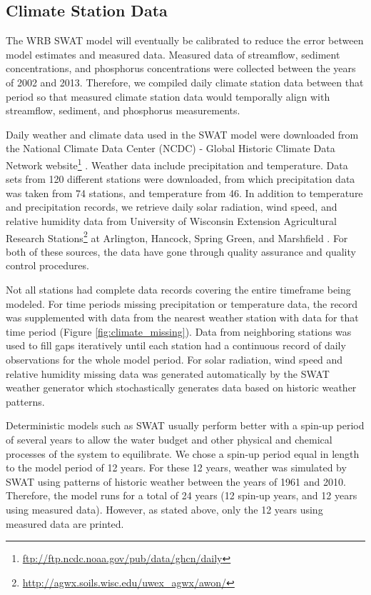 \subsection{Climate Station Data}\label{sec:climate_data}

The WRB SWAT model will eventually be calibrated to reduce the error between model estimates and measured data. Measured data of streamflow, sediment concentrations, and phosphorus concentrations were collected between the years of 2002 and 2013. Therefore, we compiled daily climate station data between that period so that measured climate station data would temporally align with streamflow, sediment, and phosphorus measurements.

Daily weather and climate data used in the SWAT model were downloaded from the National Climate Data Center (NCDC) - Global Historic Climate Data Network website\footnote{\url{ftp://ftp.ncdc.noaa.gov/pub/data/ghcn/daily}} \citep{ncdc_ghcn_2012}. 
Weather data include precipitation and temperature.  
Data sets from 120 different stations were downloaded, from which precipitation data was taken from 74 stations, and temperature from 46. 
In addition to temperature and precipitation records, we retrieve daily solar radiation, wind speed, and relative humidity data from University of Wisconsin Extension Agricultural Research Stations\footnote{\url{http://agwx.soils.wisc.edu/uwex_agwx/awon/}} at Arlington, Hancock, Spring Green, and Marshfield . 
For both of these sources, the data have gone through quality assurance and quality control procedures.

Not all stations had complete data records covering the entire timeframe being modeled.  For time periods missing precipitation or temperature data, the record was supplemented with data from the nearest weather station with data for that time period (Figure \ref{fig:climate_missing}). Data from neighboring stations was used to fill gaps iteratively until each station had a continuous record of daily observations for the whole model period. For solar radiation, wind speed and relative humidity missing data was generated automatically by the SWAT weather generator which stochastically generates data based on historic weather patterns.

Deterministic models such as SWAT usually perform better with a spin-up period of several years to allow the water budget and other physical and chemical processes of the system to equilibrate. We chose a spin-up period equal in length to the model period of 12 years. For these 12 years, weather was simulated by SWAT using patterns of historic weather between the years of 1961 and 2010. Therefore, the model runs for a total of 24 years (12 spin-up years, and 12 years using measured data). However, as stated above, only the 12 years using measured data are printed.
